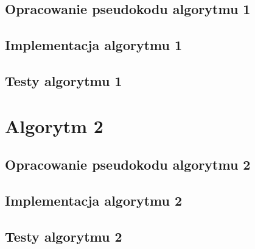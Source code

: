 \subsection{Opracowanie pseudokodu algorytmu 1}
\subsection{Implementacja algorytmu 1}
\subsection{Testy algorytmu 1}
\section{Algorytm 2}
\subsection{Opracowanie pseudokodu algorytmu 2}
\subsection{Implementacja algorytmu 2}
\subsection{Testy algorytmu 2}
